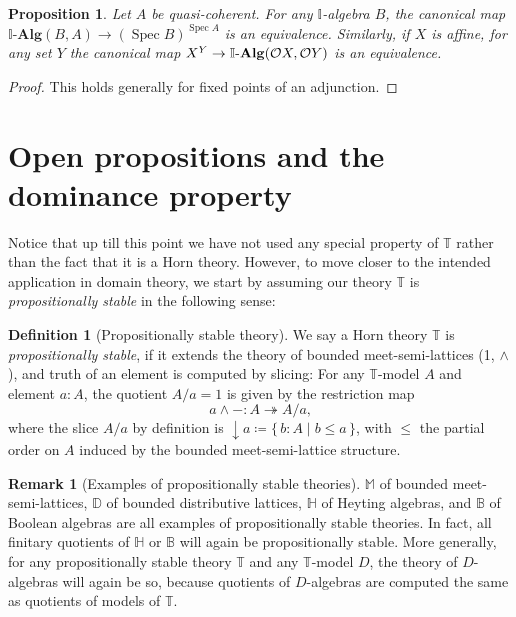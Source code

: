 \documentclass[a4paper,12pt]{amsart}
\newtheorem{proposition}[theorem]{Proposition}
\theoremstyle{definition}
\newtheorem{definition}[theorem]{Definition}
\newtheorem{remark}[theorem]{Remark}
\newcommand{\mb}[1]{\mathbf{#1}}
\newcommand{\mbb}[1]{\mathbb{#1}}
\newcommand{\T}{\mbb T}
\newcommand{\I}{\mbb I}
\newcommand{\alg}{\text{-}\mb{Alg}}
\newcommand{\scomp}[2]{\{\,#1\mid#2\,\}}
\newcommand{\surj}{\twoheadrightarrow}
\newcommand{\cv}{\operatorname{\downarrow}}
\newcommand{\spec}{\operatorname{Spec}}
\begin{document}
\begin{proposition}\label{prop:duality}
  Let $A$ be quasi-coherent. For any $\I$-algebra $B$, the canonical map $\I\alg(B,A) \to (\spec B)^{\spec A}$ is an equivalence. Similarly, if $X$ is affine, for any set $Y$ the canonical map $X^Y \to \I\alg(\opens X,\opens Y)$ is an equivalence.
\end{proposition}
\begin{proof}
  This holds generally for fixed points of an adjunction.
\end{proof}


\section{Open propositions and the dominance property}\label{sec:dominance}

Notice that up till this point we have not used any special property of $\T$ rather than the fact that it is a Horn theory. However, to move closer to the intended application in domain theory, we start by assuming our theory $\T$ is \emph{propositionally stable} in the following sense: 

\begin{definition}[Propositionally stable theory]\label{defn:propositional}
  We say a Horn theory $\T$ is \emph{propositionally stable}, if it extends the theory of bounded meet-semi-lattices (1, $\wedge$), and truth of an element is computed by slicing: For any $\T$-model $A$ and element $a:A$, the quotient $A/a=1$ is given by the restriction map
  \[ {a \wedge -} \colon A \surj A/a\text{,} \]
  where the slice $A/a$ by definition is ${\cv} a \coloneq \scomp{b:A}{b\le a}$, with $\le$ the partial order on $A$ induced by the bounded meet-semi-lattice structure.
\end{definition}

\begin{remark}[Examples of propositionally stable theories]
  $\mbb M$ of bounded meet-semi-lattices, $\mbb D$ of bounded distributive lattices, $\mbb H$ of Heyting algebras, and $\mbb B$ of Boolean algebras are all examples of propositionally stable theories. In fact, all finitary quotients of $\mbb H$ or $\mbb B$ will again be propositionally stable. More generally, for any propositionally stable theory $\T$ and any $\T$-model $D$, the theory of $D$-algebras will again be so, because quotients of $D$-algebras are computed the same as quotients of models of $\T$.
\end{remark}
\end{document}
